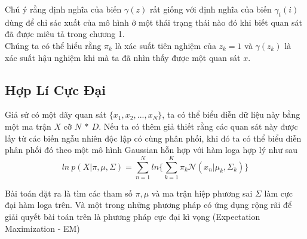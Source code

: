 \documentclass[13pt]{extreport}
\begin{document}
Chú ý rằng định nghĩa của biến $\gamma(z)$ rất giống với định nghĩa của biến $\gamma_t(i)$ dùng để chỉ sác xuất của mô hình ở một thái trạng thái nào đó khi biết quan sát đã được miêu tả trong chương 1. \\
Chúng ta có thể hiểu rằng $\pi_k$ là xác suất tiên nghiệm của $z_k = 1$ và $\gamma(z_k)$ là xác suất hậu nghiệm khi mà ta đã nhìn thấy được một quan sát $x$.
\subsection{Hợp Lí Cực Đại}
Giả sử có một dãy quan sát $\{ x_1, x_2, ..., x_N\}$, ta có thể biểu diễn dữ liệu này bằng một ma trận $X$ cỡ $N \ * \ D$. Nếu ta có thêm giả thiết rằng các quan sát này được lấy từ các biến ngẫu nhiên độc lập có cùng phân phối, khi đó ta có thể biểu diễn phân phối đó theo một mô hình Gaussian hỗn hợp với hàm loga hợp lý như sau
$$ln \ p(X| \pi, \mu, \Sigma) = \sum_{n=1}^{N} ln \Bigg\{\sum_{k=1}^{K}\pi_k \mathcal{N}(x_n| \mu_k, \Sigma_k)\Bigg\}$$

Bài toán đặt ra là tìm các tham số $\pi, \mu$ và ma trận hiệp phương sai $\Sigma$ làm cực đại hàm loga trên. Và một trong những phương pháp có ứng dụng rộng rãi để giải quyết bài toán trên là phương pháp cực đại kì vọng (Expectation Maximization - EM)
\end{document}

